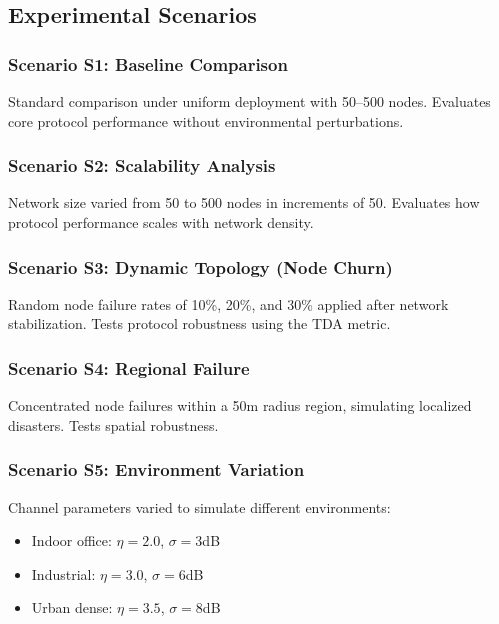 \subsection{Experimental Scenarios}

\subsubsection{Scenario S1: Baseline Comparison}

Standard comparison under uniform deployment with 50--500 nodes. Evaluates
core protocol performance without environmental perturbations.

\subsubsection{Scenario S2: Scalability Analysis}

Network size varied from 50 to 500 nodes in increments of 50. Evaluates
how protocol performance scales with network density.

\subsubsection{Scenario S3: Dynamic Topology (Node Churn)}

Random node failure rates of 10\%, 20\%, and 30\% applied after network
stabilization. Tests protocol robustness using the TDA metric.

\subsubsection{Scenario S4: Regional Failure}

Concentrated node failures within a 50m radius region, simulating localized
disasters. Tests spatial robustness.

\subsubsection{Scenario S5: Environment Variation}

Channel parameters varied to simulate different environments:
\begin{itemize}
    \item Indoor office: $\eta = 2.0$, $\sigma = 3$dB
    \item Industrial: $\eta = 3.0$, $\sigma = 6$dB
    \item Urban dense: $\eta = 3.5$, $\sigma = 8$dB
\end{itemize}

